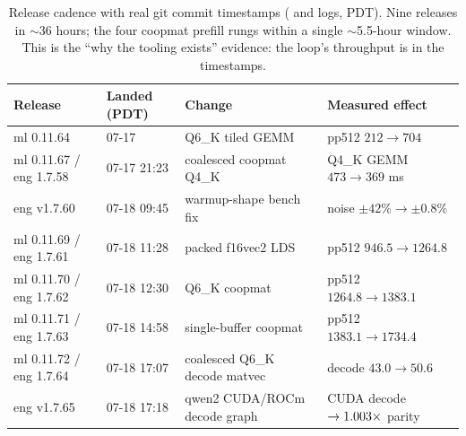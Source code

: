 \documentclass[11pt]{article}
\begin{document}
\begin{table}[h]
\centering\small
\setlength{\tabcolsep}{5pt}
\renewcommand{\arraystretch}{1.1}
\begin{tabular}{@{}l l >{\raggedright\arraybackslash}p{} >{\raggedright\arraybackslash}p{}@{}}
\toprule
\textbf{Release} & \textbf{Landed (PDT)} & \textbf{Change} & \textbf{Measured effect} \\
\midrule
ml 0.11.64             & 07-17         & Q6\_K tiled GEMM              & pp512 $212\to704$ \\
ml 0.11.67 / eng 1.7.58 & 07-17 21{:}23 & coalesced coopmat Q4\_K      & Q4\_K GEMM $473\to369$ ms \\
eng v1.7.60            & 07-18 09{:}45 & warmup-shape bench fix       & noise $\pm42\%\to\pm0.8\%$ \\
ml 0.11.69 / eng 1.7.61 & 07-18 11{:}28 & packed f16vec2 LDS          & pp512 $946.5\to1264.8$ \\
ml 0.11.70 / eng 1.7.62 & 07-18 12{:}30 & Q6\_K coopmat               & pp512 $1264.8\to1383.1$ \\
ml 0.11.71 / eng 1.7.63 & 07-18 14{:}58 & single-buffer coopmat       & pp512 $1383.1\to1734.4$ \\
ml 0.11.72 / eng 1.7.64 & 07-18 17{:}07 & coalesced Q6\_K decode matvec & decode $43.0\to50.6$ \\
eng v1.7.65            & 07-18 17{:}18 & qwen2 CUDA/ROCm decode graph & CUDA decode $\to 1.003\times$ parity \\
\bottomrule
\end{tabular}
\caption{Release cadence with real git commit timestamps ( and  logs, PDT). Nine
releases in $\sim$36 hours; the four coopmat prefill rungs within a single $\sim$5.5-hour window. This is
the ``why the tooling exists'' evidence: the loop's throughput is in the timestamps.}
\label{tab:velocity}
\end{table}
\end{document}
